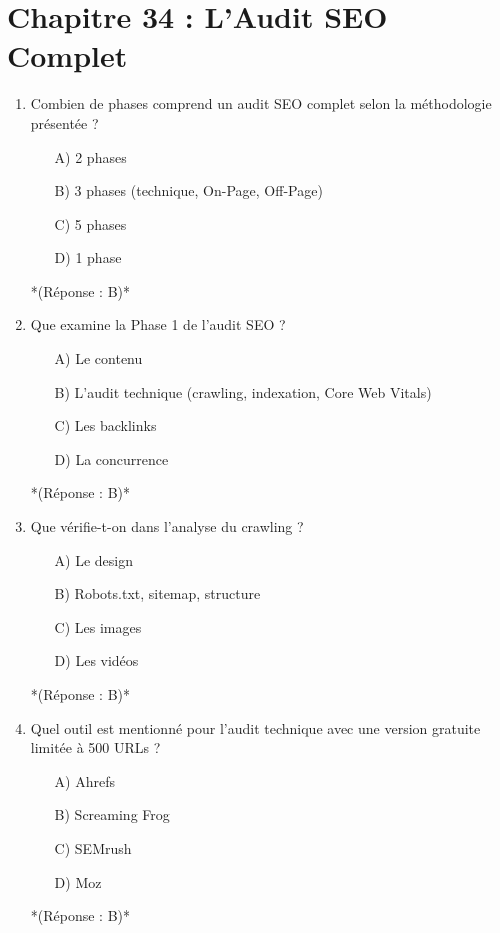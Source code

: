 \documentclass[12pt,a4paper,twoside]{report}
\begin{document}
\section*{Chapitre 34 : L'Audit SEO Complet}
\begin{enumerate}
    \item Combien de phases comprend un audit SEO complet selon la méthodologie présentée ?
    \begin{itemize}
        \item[A)] 2 phases
        \item[B)] 3 phases (technique, On-Page, Off-Page)
        \item[C)] 5 phases
        \item[D)] 1 phase
    \end{itemize}
    *(Réponse : B)*

    \item Que examine la Phase 1 de l'audit SEO ?
    \begin{itemize}
        \item[A)] Le contenu
        \item[B)] L'audit technique (crawling, indexation, Core Web Vitals)
        \item[C)] Les backlinks
        \item[D)] La concurrence
    \end{itemize}
    *(Réponse : B)*

    \item Que vérifie-t-on dans l'analyse du crawling ?
    \begin{itemize}
        \item[A)] Le design
        \item[B)] Robots.txt, sitemap, structure
        \item[C)] Les images
        \item[D)] Les vidéos
    \end{itemize}
    *(Réponse : B)*

    \item Quel outil est mentionné pour l'audit technique avec une version gratuite limitée à 500 URLs ?
    \begin{itemize}
        \item[A)] Ahrefs
        \item[B)] Screaming Frog
        \item[C)] SEMrush
        \item[D)] Moz
    \end{itemize}
    *(Réponse : B)*


\end{enumerate}
\end{document}
